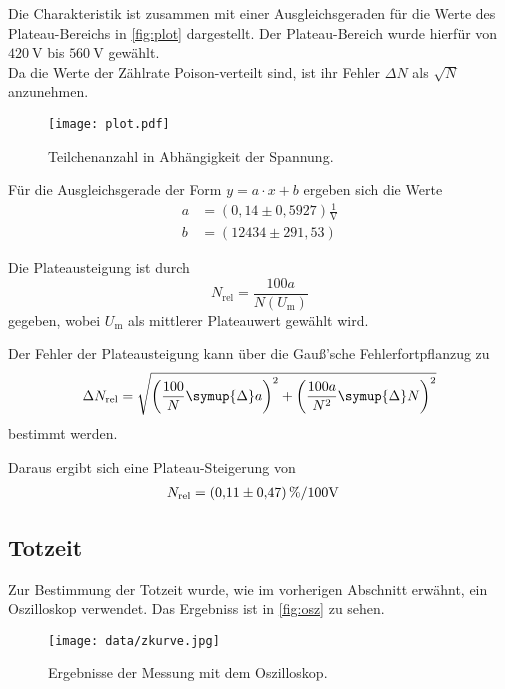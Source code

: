Die Charakteristik ist zusammen mit einer Ausgleichsgeraden für die Werte des Plateau-Bereichs in \autoref{fig:plot} dargestellt. Der Plateau-Bereich wurde hierfür
von $\SI{420}{\volt}$ bis $\SI{560}{\volt}$ gewählt.\\
Da die Werte der Zählrate Poison-verteilt sind, ist ihr Fehler $\Delta N$ als $\sqrt{N}$ anzunehmen.

\begin{figure}[H]
  \centering
  \texttt{[image: plot.pdf]}
  \caption{Teilchenanzahl in Abhängigkeit der Spannung.}
  \label{fig:plot}
\end{figure}


Für die Ausgleichsgerade der Form $y = a \cdot x + b$ ergeben sich die Werte
\begin{align*}
  a &= (0,14 \pm 0,5927) \frac{1}{\si{\volt}} \\
  b &= (12434 \pm 291,53)
\end{align*}





Die Plateausteigung ist durch
\begin{equation*}
  N_\text{rel} = \frac{100a}{N(U_\text{m})}
\end{equation*}
gegeben, wobei $U_\text{m}$ als mittlerer Plateauwert gewählt wird.

Der Fehler der Plateausteigung kann über die Gauß'sche Fehlerfortpflanzug zu
\begin{equation*}
  \Delta N_\text{rel} = \sqrt{\left(\frac{100}{N}\symup{\Delta}a\right)^2 + \left(\frac{100a}{N^2} \symup{\Delta}N\right)^2}
\end{equation*}
bestimmt werden.






Daraus ergibt sich eine Plateau-Steigerung von
\begin{align*}
  N_\text{rel} &= \SI{0,11+-0,47}{\percent\per100\volt}
\end{align*}


\subsection{Totzeit}

Zur Bestimmung der Totzeit wurde, wie im vorherigen Abschnitt erwähnt, ein Oszilloskop verwendet. Das Ergebniss ist in \autoref{fig:osz} zu sehen.
\begin{figure}[H]
  \centering
  \texttt{[image: data/zkurve.jpg]}
  \caption{Ergebnisse der Messung mit dem Oszilloskop.}
  \label{fig:osz}
\end{figure}

